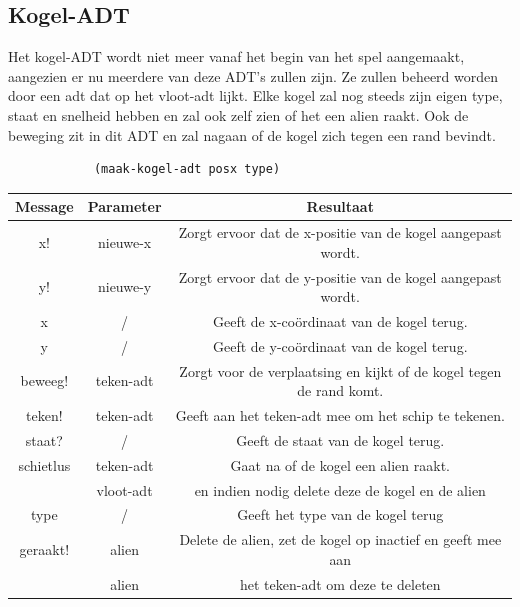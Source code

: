 \documentclass[]{article}
\begin{document}
\subsection{Kogel-ADT}
Het kogel-ADT wordt niet meer vanaf het begin van het spel aangemaakt, aangezien er nu meerdere van deze ADT's zullen zijn. Ze zullen beheerd worden door een adt dat op het vloot-adt lijkt. Elke kogel zal nog steeds zijn eigen type, staat en snelheid hebben en zal ook zelf zien of het een alien raakt. Ook de beweging zit in dit ADT en zal nagaan of de kogel zich tegen een rand bevindt. 
\begin{center}
		\begin{lstlisting}
			(maak-kogel-adt posx type)
		\end{lstlisting}
	\begin{tabular}{|c|c|c|}
		\hline  \textbf{Message} & \textbf{Parameter} & \textbf{Resultaat}  \\
		\hline  x! & nieuwe-x & Zorgt ervoor dat de x-positie van de kogel aangepast wordt.\\ 
		\hline  y! & nieuwe-y& Zorgt ervoor dat de y-positie van de kogel aangepast wordt.\\
		\hline x & /&Geeft de x-co\"{o}rdinaat van de kogel terug. \\
		\hline y & /&Geeft de y-co\"{o}rdinaat van de kogel terug. \\
		\hline beweeg! & teken-adt & Zorgt voor de verplaatsing en kijkt of de kogel tegen de rand komt. \\
		\hline teken! & teken-adt&  Geeft aan het teken-adt mee om het schip te tekenen. \\
		\hline staat? & /& Geeft de staat van de kogel terug. \\
		\hline schietlus & teken-adt &Gaat na of de kogel een alien raakt. \\ & vloot-adt& en indien nodig delete deze de kogel en de alien \\
		\hline type & / & Geeft het type van de kogel terug \\
		\hline geraakt! & alien & Delete de alien, zet de kogel op inactief en geeft mee aan  \\ & alien & het teken-adt om deze te deleten \\
		\hline
	\end{tabular}
\end{center}
\end{document}
